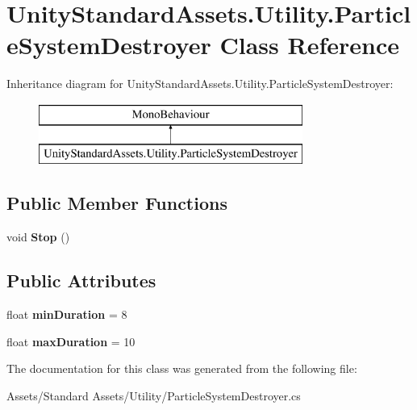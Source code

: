 \hypertarget{class_unity_standard_assets_1_1_utility_1_1_particle_system_destroyer}{}\section{Unity\+Standard\+Assets.\+Utility.\+Particle\+System\+Destroyer Class Reference}
\label{class_unity_standard_assets_1_1_utility_1_1_particle_system_destroyer}
Inheritance diagram for Unity\+Standard\+Assets.\+Utility.\+Particle\+System\+Destroyer\+:\begin{figure}[H]
\begin{center}
\leavevmode
\includegraphics[height=2.000000cm]{class_unity_standard_assets_1_1_utility_1_1_particle_system_destroyer}
\end{center}
\end{figure}
\subsection*{Public Member Functions}
\begin{DoxyCompactItemize}
\item 
void {\bfseries Stop} ()\hypertarget{class_unity_standard_assets_1_1_utility_1_1_particle_system_destroyer_ab6c9ecc82e2626fbd5b6d14d219a0935}{}\label{class_unity_standard_assets_1_1_utility_1_1_particle_system_destroyer_ab6c9ecc82e2626fbd5b6d14d219a0935}

\end{DoxyCompactItemize}
\subsection*{Public Attributes}
\begin{DoxyCompactItemize}
\item 
float {\bfseries min\+Duration} = 8\hypertarget{class_unity_standard_assets_1_1_utility_1_1_particle_system_destroyer_aa3a334590fac10160cfead516a72e25b}{}\label{class_unity_standard_assets_1_1_utility_1_1_particle_system_destroyer_aa3a334590fac10160cfead516a72e25b}

\item 
float {\bfseries max\+Duration} = 10\hypertarget{class_unity_standard_assets_1_1_utility_1_1_particle_system_destroyer_a8cfb6e6979b64567e06ab8da46415793}{}\label{class_unity_standard_assets_1_1_utility_1_1_particle_system_destroyer_a8cfb6e6979b64567e06ab8da46415793}

\end{DoxyCompactItemize}


The documentation for this class was generated from the following file\+:\begin{DoxyCompactItemize}
\item 
Assets/\+Standard Assets/\+Utility/Particle\+System\+Destroyer.\+cs\end{DoxyCompactItemize}
